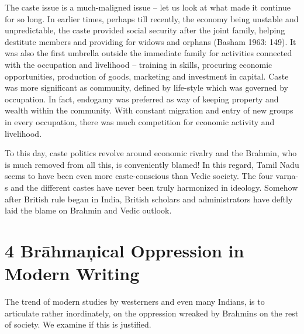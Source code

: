 The caste issue is a much-maligned issue – let us look at what made it continue for so long. In earlier times, perhaps till recently, the economy being unstable and unpredictable, the caste provided social security after the joint family, helping destitute members and providing for widows and orphans (Basham 1963: 149). It was also the first umbrella outside the immediate family for activities connected with the occupation and livelihood – training in skills, procuring economic opportunities, production of goods, marketing and investment in capital. Caste was more significant as community, defined by life-style which was governed by occupation. In fact, endogamy was preferred as way of keeping property and wealth within the community. With constant migration and entry of new groups in every occupation, there was much competition for economic activity and livelihood.

To this day, caste politics revolve around economic rivalry and the Brahmin, who is much removed from all this, is conveniently blamed! In this regard, Tamil Nadu seems to have been even more caste-conscious than Vedic society. The four varņa-s and the different castes have never been truly harmonized in ideology. Somehow after British rule began in India, British scholars and administrators have deftly laid the blame on Brahmin and Vedic outlook.


\section*{4 Brāhmaņical Oppression in Modern Writing}

The trend of modern studies by westerners and even many Indians, is to articulate rather inordinately, on the oppression wreaked by Brahmins on the rest of society. We examine if this is justified.

